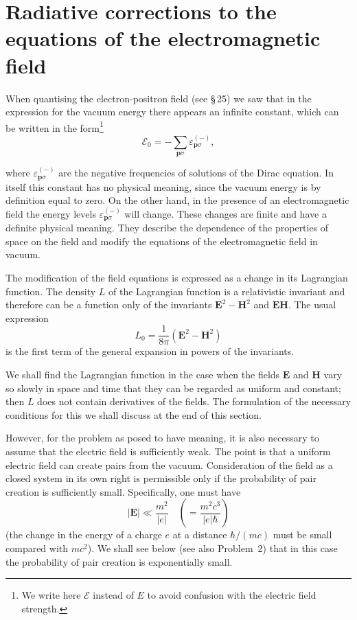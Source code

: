 
\section{Radiative corrections to the equations of the electromagnetic field}


When quantising the electron-positron field (see \S\,25) we saw that in the expression for the vacuum energy there appears an infinite constant, which can be written in the form\footnote{We write here $\mathcal{E}$ instead of $E$ to avoid confusion with the electric field strength.}
\begin{equation}
\mathcal{E}_0 = -\sum_{\mathbf{p}\sigma}\varepsilon_{\mathbf{p}\sigma}^{(-)},
\label{eq:129.1}
\end{equation}


\noindent where $\varepsilon_{\mathbf{p}\sigma}^{(-)}$ are the negative frequencies of solutions of the Dirac equation. In itself this constant has no physical meaning, since the vacuum energy is by definition equal to zero. On the other hand, in the presence of an electromagnetic field the energy levels $\varepsilon_{\mathbf{p}\sigma}^{(-)}$ will change. These changes are finite and have a definite physical meaning. They describe the dependence of the properties of space on the field and modify the equations of the electromagnetic field in vacuum.

The modification of the field equations is expressed as a change in its Lagrangian function. The density $L$ of the Lagrangian function is a relativistic invariant and therefore can be a function only of the invariants $\mathbf{E}^2 - \mathbf{H}^2$ and $\mathbf{E}\mathbf{H}$. The usual expression
\begin{equation}
L_0 = \frac{1}{8\pi}(\mathbf{E}^2 - \mathbf{H}^2)
\label{eq:129.2}
\end{equation}
is the first term of the general expansion in powers of the invariants.

We shall find the Lagrangian function in the case when the fields $\mathbf{E}$ and $\mathbf{H}$ vary so slowly in space and time that they can be regarded as uniform and constant; then $L$ does not contain derivatives of the fields. The formulation of the necessary conditions for this we shall discuss at the end of this section.

However, for the problem as posed to have meaning, it is also necessary to assume that the electric field is sufficiently weak. The point is that a uniform electric field can create pairs from the vacuum. Consideration of the field as a closed system in its own right is permissible only if the probability of pair creation is sufficiently small. Specifically, one must have
\begin{equation}
|\mathbf{E}| \ll \frac{m^2}{|e|}\quad\left(=\frac{m^2c^3}{|e|\hbar}\right)
\label{eq:129.3}
\end{equation}
(the change in the energy of a charge $e$ at a distance $\hbar/(mc)$ must be small compared with $mc^2$). We shall see below (see also Problem~2) that in this case the probability of pair creation is exponentially small.

